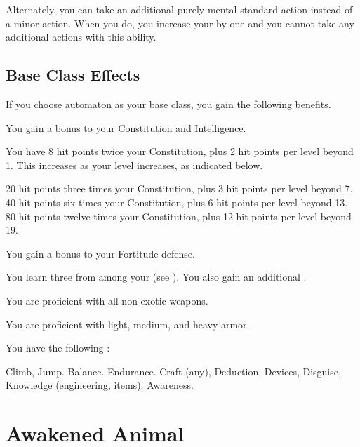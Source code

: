       Alternately, you can take an additional purely mental standard action instead of a minor action.
      When you do, you increase your  by one and you  cannot take any additional actions with this ability.

  \subsection{Base Class Effects}
    If you choose automaton as your base class, you gain the following benefits.

     You gain a  bonus to your Constitution and Intelligence.

      You have 8 hit points \add twice your Constitution, plus 2 hit points per level beyond 1.
      This increases as your level increases, as indicated below.
      \begin{itemize}
         20 hit points \add three times your Constitution, plus 3 hit points per level beyond 7.
         40 hit points \add six times your Constitution, plus 6 hit points per level beyond 13.
         80 hit points \add twelve times your Constitution, plus 12 hit points per level beyond 19.
      \end{itemize}

      You gain a  bonus to your Fortitude defense.

    You learn three  from among your  (see ). You also gain an additional .

      You are proficient with all non-exotic weapons.

      You are proficient with light, medium, and heavy armor.

      You have the following :
      \begin{itemize}
         Climb, Jump.
         Balance.
         Endurance.
         Craft (any), Deduction, Devices, Disguise, Knowledge (engineering, items).
         Awareness.
      \end{itemize}

\section{Awakened Animal}

